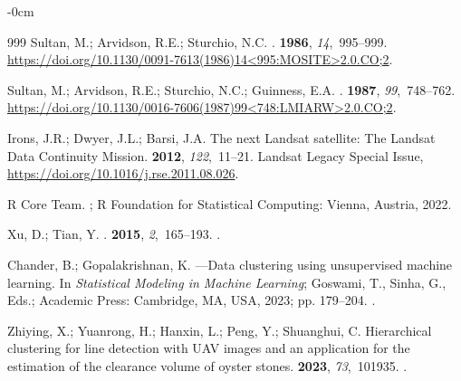\documentclass[information,article,accept,pdftex,moreauthors]{Definitions/mdpi}
\begin{document}
\begin{adjustwidth}{-\extralength}{0cm}
\begin{thebibliography}{999}
Sultan, M.; Arvidson, R.E.; Sturchio, N.C.
.
 {\bf 1986}, {\em 14},~995--999.
\newblock
  {\url{https://doi.org/10.1130/0091-7613(1986)14<995:MOSITE>2.0.CO;2}}.

Sultan, M.; Arvidson, R.E.; Sturchio, N.C.; Guinness, E.A.
.
 {\bf 1987}, {\em 99},~748--762.
\newblock
  {\url{https://doi.org/10.1130/0016-7606(1987)99<748:LMIARW>2.0.CO;2}}.

Irons, J.R.; Dwyer, J.L.; Barsi, J.A.
\newblock The next Landsat satellite: The Landsat Data Continuity Mission.
 {\bf 2012}, {\em 122},~11--21.
\newblock Landsat Legacy Special Issue,
  {\url{https://doi.org/10.1016/j.rse.2011.08.026}}.

{R Core Team}.
;
\newblock R Foundation for Statistical Computing: Vienna, Austria,  2022.

Xu, D.; Tian, Y.
.
 {\bf 2015}, {\em 2},~165--193.
.

Chander, B.; Gopalakrishnan, K.
---Data clustering using unsupervised machine learning. In {\em
  Statistical Modeling in Machine Learning}; Goswami, T., Sinha, G., Eds.;
  Academic Press: Cambridge, MA, USA, %
  2023; pp. 179--204.
.

Zhiying, X.; Yuanrong, H.; Hanxin, L.; Peng, Y.; Shuanghui, C.
\newblock Hierarchical clustering for line detection with UAV images and an
  application for the estimation of the clearance volume of oyster stones.
 {\bf 2023}, {\em 73},~101935.
.


\end{thebibliography}
\end{adjustwidth}
\end{document}
